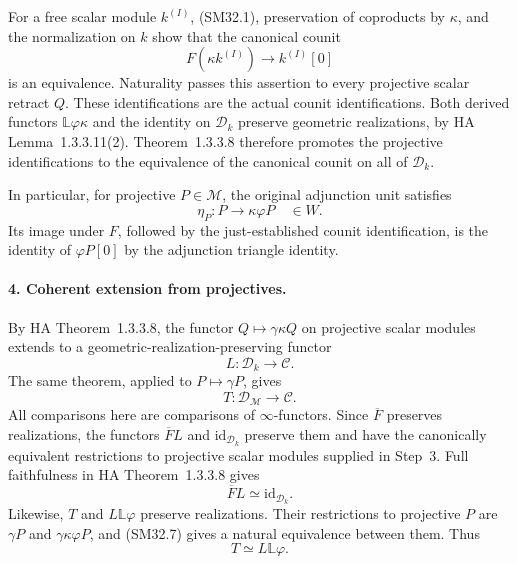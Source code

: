 \documentclass[11pt,a4paper]{article}
\theoremstyle{definition}\newtheorem{definition}[theorem]{Definition}
\theoremstyle{remark}\newtheorem{remark}[theorem]{Remark}
\begin{document}
For a free scalar module \(k^{(I)}\), (SM32.1), preservation
of coproducts by \(\kappa\), and the normalization on \(k\)
show that the canonical counit
\[
          F(\kappa k^{(I)})\longrightarrow k^{(I)}[0]
\]
is an equivalence.  Naturality passes this assertion to every
projective scalar retract \(Q\).  These identifications are
the actual counit identifications.  Both derived functors
\(\mathbb L\varphi\kappa\) and the identity on
\(\mathcal D_k\) preserve geometric realizations, by HA
Lemma~1.3.3.11(2).  Theorem~1.3.3.8 therefore promotes the
projective identifications to the equivalence of the canonical
counit on all of \(\mathcal D_k\).

In particular, for projective \(P\in\mathcal M\), the original
adjunction unit satisfies
\[
                 \eta_P:P\longrightarrow\kappa\varphi P
                            \quad\in W.                       \tag{SM32.7}
\]
Its image under \(F\), followed by the just-established
counit identification, is the identity of \(\varphi P[0]\)
by the adjunction triangle identity.

\paragraph{4. Coherent extension from projectives.}
By HA Theorem~1.3.3.8, the functor
\(Q\mapsto\gamma\kappa Q\) on projective scalar modules
extends to a geometric-realization-preserving functor
\[
                         L:\mathcal D_k\longrightarrow\mathcal C.
                                                               \tag{SM32.8}
\]
The same theorem, applied to \(P\mapsto\gamma P\), gives
\[
                    T:\mathcal D_{\mathcal M}\longrightarrow\mathcal C.
                                                               \tag{SM32.9}
\]
All comparisons here are comparisons of \(\infty\)-functors.
Since \(\overline F\) preserves realizations, the functors
\(\overline F L\) and \(\mathrm{id}_{\mathcal D_k}\)
preserve them and have the canonically equivalent restrictions
to projective scalar modules supplied in Step~3.
Full faithfulness in HA Theorem~1.3.3.8 gives
\[
                      \overline F L\simeq\mathrm{id}_{\mathcal D_k}.
                                                               \tag{SM32.10}
\]
Likewise, \(T\) and \(L\mathbb L\varphi\) preserve
realizations.  Their restrictions to projective \(P\) are
\(\gamma P\) and \(\gamma\kappa\varphi P\), and (SM32.7)
gives a natural equivalence between them.  Thus
\[
                             T\simeq L\mathbb L\varphi.       \tag{SM32.11}
\]
\end{document}
